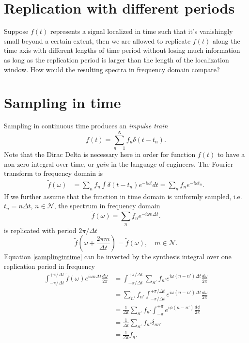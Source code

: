 \documentclass[
10pt, %
a4paper, %
oneside, %
headinclude,footinclude, %
BCOR5mm, %
]{scrartcl}
\begin{document}
\section{Replication with different periods}
Suppose $f(t)$ represents a signal localized in time such that it's vanishingly small beyond a certain extent, then we are allowed to replicate $f(t)$ along the time axis with different lengths of time period without losing much information as long as the replication period is larger than the length of the localization window. How would the resulting spectra in frequency domain compare?

\section{Sampling in time}
Sampling in continuous time produces an \textit{impulse train}
\begin{equation}
f(t) = \sum_{n=1}^N f_n \delta(t-t_n).
\end{equation} 
Note that the Dirac Delta is necessary here in order for function $f(t)$ to have a non-zero integral over time, or \textit{gain} in the language of engineers. The Fourier transform to frequency domain is
\begin{align}
 \tilde{f}(\omega) &= \sum_n f_n \int \delta(t-t_n)e^{-i\omega t} dt = \sum_n f_n e^{-i\omega t_n}.
\end{align}
If we further assume that the function in time domain is uniformly sampled, i.e. $t_n = n\Delta t$, $n\in\mathcal{N}$, the spectrum in frequency domain
\begin{equation}\label{samplingintime}
\tilde{f}(\omega) = \sum_n f_n e^{-i\omega n \Delta t}.
\end{equation}
is replicated with period $2\pi/\Delta t$
\begin{equation}
\tilde{f}\left(\omega + \frac{2\pi m}{\Delta t}\right) = \tilde{f}(\omega), \quad m \in \mathcal{N}.
\end{equation}
Equation \ref{samplingintime} can be inverted by the synthesis integral over one replication period in frequency
\begin{align}
\nonumber \int_{-\pi/\Delta t}^{+\pi/\Delta t} \tilde{f}(\omega)e^{i\omega n\Delta t}\frac{d\omega}{2\pi}
&= \int_{-\pi/\Delta t}^{+\pi/\Delta t}  \sum_{n'} f_{n'} e^{i\omega (n-n') \Delta t} \frac{d\omega}{2\pi}\\
\nonumber &=  \sum_{n'} f_{n'} \int_{-\pi/\Delta t}^{+\pi/\Delta t}  e^{i\omega (n-n') \Delta t} \frac{d\omega}{2\pi} \\
\nonumber &=  \frac{1}{\Delta t}\sum_{n'} f_{n'} \int_{-\pi}^{+\pi}  e^{i\phi (n-n')} \frac{d\phi}{2\pi} \\
\nonumber &=  \frac{1}{\Delta t}\sum_{n'} f_{n'} \delta_{nn'} \\
 &=  \frac{1}{\Delta t}f_n.
\end{align}
\end{document}
